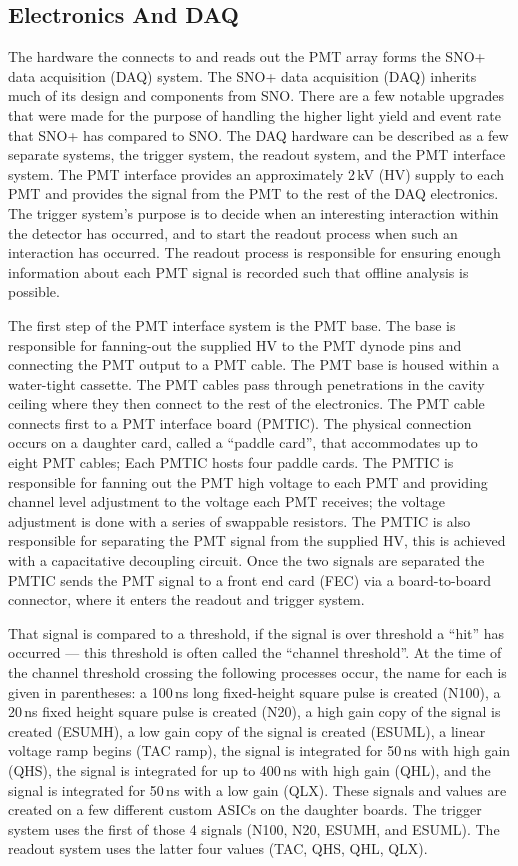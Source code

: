 \subsection{Electronics And DAQ}
The hardware the connects to and reads out the PMT array forms the SNO+ data acquisition (DAQ)
system\@.
The SNO+ data acquisition (DAQ) inherits much of its design and components from
SNO\@.
There are a few notable upgrades that were made for the purpose of handling the
higher light yield and event rate that SNO+ has compared to SNO\@.
The DAQ hardware can be described as a few separate systems, the trigger system,
the readout system, and the PMT interface system.
The PMT interface provides an approximately 2\,kV (HV) supply to each PMT and provides
the signal from the PMT to the rest of the DAQ electronics.
The trigger system's purpose is to decide when an interesting interaction
within the detector has occurred, and to start the readout process when such an
interaction has occurred.
The readout process is responsible for ensuring enough information about each
PMT signal is recorded such that offline analysis is possible.

The first step of the PMT interface system is the PMT base. The base is responsible
for fanning-out the supplied HV to the PMT dynode pins and connecting the PMT output
to a PMT cable. The PMT base is housed within a water-tight cassette.
The PMT cables pass through penetrations in the cavity ceiling where they then connect
to the rest of the electronics. The PMT cable connects first to a PMT interface
board (PMTIC). The physical connection occurs on a daughter card, called a ``paddle card'',
that accommodates up to eight PMT cables; Each PMTIC hosts four paddle cards.
The PMTIC is responsible for fanning out the PMT high voltage
to each PMT and providing channel level adjustment to the voltage
each PMT receives; the voltage adjustment is done with a series of
swappable resistors.
The PMTIC is also responsible for separating the PMT signal from the supplied
HV, this is achieved with a capacitative decoupling circuit.
Once the two signals are separated the PMTIC sends the PMT signal to
a front end card (FEC) via a board-to-board connector, where it enters
the readout and trigger system.

That signal is compared to a threshold, if the signal is over threshold a ``hit''
has occurred --- this threshold is often called the ``channel threshold''.
At the time of the channel threshold crossing the following processes occur, the name for each is given
in parentheses:
a 100\,ns long fixed-height square pulse is created (N100), a 20\,ns fixed height square pulse is created (N20),
a high gain copy of the signal is created (ESUMH), a low gain copy of the signal
is created (ESUML), a linear voltage ramp begins (TAC ramp), the signal is integrated for
50\,ns with high gain (QHS), the signal is integrated for up to 400\,ns with high gain (QHL),
and the signal is integrated for 50\,ns with a low gain (QLX).
These signals and values are created on a few different custom ASICs on the
daughter boards.
The trigger system uses the first of those 4 signals (N100, N20, ESUMH, and ESUML).
The readout system uses the latter four values (TAC, QHS, QHL, QLX).

